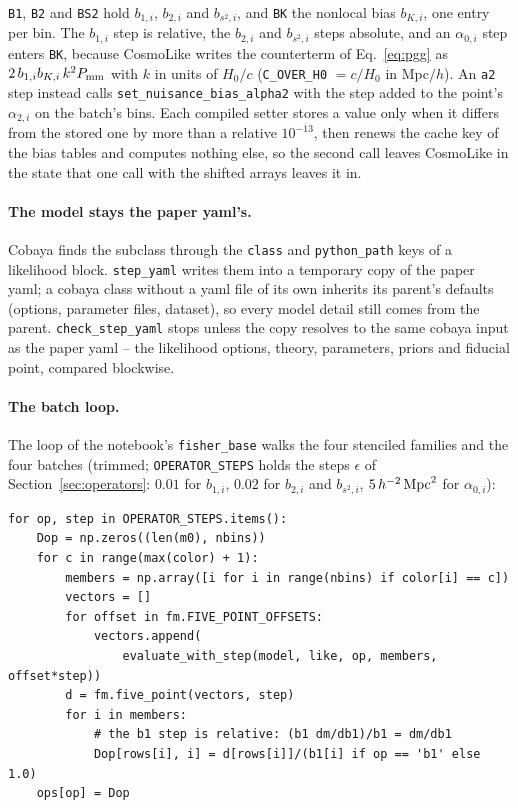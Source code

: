 \documentclass[11pt]{article}
\newcommand{\aunit}{\,h^{-2}\,{\rm Mpc}^2}
\newcommand{\us}{\_\allowbreak}
\begin{document}
\noindent \texttt{B1}, \texttt{B2} and \texttt{BS2} hold $b_{1,i}$,
$b_{2,i}$ and $b_{s^2,i}$, and \texttt{BK} the nonlocal bias
$b_{K,i}$, one entry per bin.  The $b_{1,i}$ step is relative, the
$b_{2,i}$ and $b_{s^2,i}$ steps absolute, and an $\alpha_{0,i}$ step
enters \texttt{BK}, because CosmoLike writes the counterterm of
Eq.~\eqref{eq:pgg} as $2\,b_{1,i} b_{K,i}\,k^2 P_{\rm mm}$ with $k$ in
units of $H_0/c$ (\texttt{C\us OVER\us H0} $= c/H_0$ in Mpc$/h$).  An
\texttt{a2} step instead calls
\texttt{set\us nuisance\us bias\us alpha2} with the step added to the
point's $\alpha_{2,i}$ on the batch's bins.  Each compiled setter
stores a value only when it differs from the stored one by more than a
relative $10^{-13}$, then renews the cache key of the bias tables and
computes nothing else, so the second call leaves CosmoLike in the
state that one call with the shifted arrays leaves it in.

\paragraph{The model stays the paper yaml's.}
Cobaya finds the subclass through the \texttt{class} and
\texttt{python\us path} keys of a likelihood block.
\texttt{step\us yaml} writes them into a temporary copy of the paper
yaml; a cobaya class without a yaml file of its own inherits its
parent's defaults (options, parameter files, dataset), so every model
detail still comes from the parent.  \texttt{check\us step\us yaml}
stops unless the copy resolves to the same cobaya input as the paper
yaml -- the likelihood options, theory, parameters, priors and
fiducial point, compared blockwise.

\paragraph{The batch loop.}
The loop of the notebook's \texttt{fisher\us base} walks the four
stenciled families and the four batches
(trimmed; \texttt{OPERATOR\us STEPS} holds the steps
$\epsilon$ of Section~\ref{sec:operators}: $0.01$ for $b_{1,i}$,
$0.02$ for $b_{2,i}$ and $b_{s^2,i}$, $5\aunit$ for $\alpha_{0,i}$):

\begin{lstlisting}
for op, step in OPERATOR_STEPS.items():
    Dop = np.zeros((len(m0), nbins))
    for c in range(max(color) + 1):
        members = np.array([i for i in range(nbins) if color[i] == c])
        vectors = []
        for offset in fm.FIVE_POINT_OFFSETS:
            vectors.append(
                evaluate_with_step(model, like, op, members, offset*step))
        d = fm.five_point(vectors, step)
        for i in members:
            # the b1 step is relative: (b1 dm/db1)/b1 = dm/db1
            Dop[rows[i], i] = d[rows[i]]/(b1[i] if op == 'b1' else 1.0)
    ops[op] = Dop
\end{lstlisting}
\end{document}
